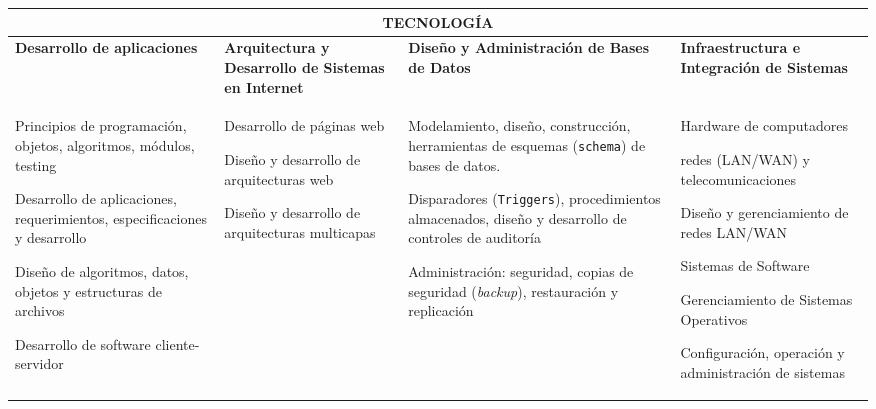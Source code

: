 \begin{center}
\begin{tabularx}{\textwidth}{|X|X|X|X|} \hline
\multicolumn{4}{|c|}{\textbf{TECNOLOGÍA}} \\ \hline
\textbf{Desarrollo de aplicaciones} & \textbf{Arquitectura y Desarrollo de Sistemas en Internet} & 
\textbf{Diseño y Administración de Bases de Datos} & \textbf{Infraestructura e Integración de Sistemas} \\ \hline

\begin{capenv}
\item Principios de programación, objetos, algoritmos, módulos, testing
\item Desarrollo de aplicaciones, requerimientos, especificaciones y desarrollo
\item Diseño de algoritmos, datos, objetos y estructuras de archivos
\item Desarrollo de software cliente-servidor
\end{capenv}
&
\begin{capenv}
\item Desarrollo de páginas web
\item Diseño y desarrollo de arquitecturas web
\item Diseño y desarrollo de arquitecturas multicapas
\end{capenv}
&
\begin{capenv}
\item Modelamiento, diseño, construcción, herramientas de esquemas (\texttt{schema}) de bases de datos.
\item Disparadores (\texttt{Triggers}), procedimientos almacenados, diseño y desarrollo de controles de auditorí­a
\item Administración: seguridad, copias de seguridad (\textit{backup}), restauración y replicación
\end{capenv}
&
\begin{capenv}
\item Hardware de computadores
\item redes (LAN/WAN) y telecomunicaciones
\item Diseño y gerenciamiento de redes LAN/WAN
\item Sistemas de Software
\item Gerenciamiento de Sistemas Operativos
\item Configuración, operación y administración de sistemas
\end{capenv} \\ \hline

\end{tabularx}
\end{center}

